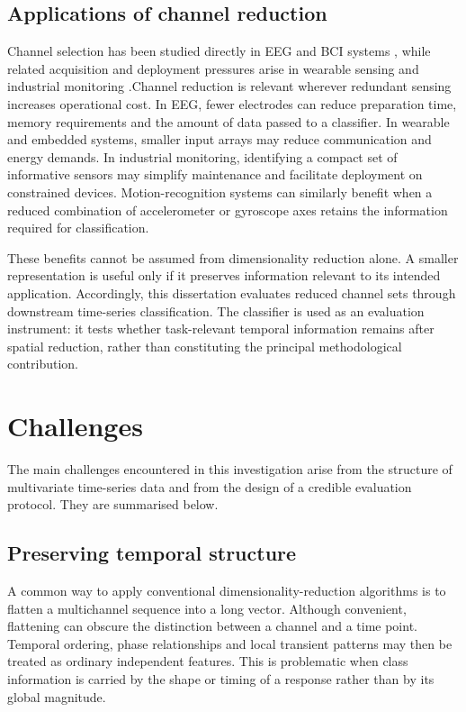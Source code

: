 \subsection{Applications of channel reduction}

Channel selection has been studied directly in EEG and BCI systems
\citep{alotaiby2015channels,lal2004channel,arvaneh2011sparsecsp},
while related acquisition and deployment pressures arise in wearable sensing
and industrial monitoring
\citep{lara2013wearable,bulling2014activity,
venkatasubramanian2003fault}.Channel reduction is relevant wherever redundant sensing increases operational cost. In EEG, fewer electrodes can reduce preparation time, memory requirements and the amount of data passed to a classifier. In wearable and embedded systems, smaller input arrays may reduce communication and energy demands. In industrial monitoring, identifying a compact set of informative sensors may simplify maintenance and facilitate deployment on constrained devices. Motion-recognition systems can similarly benefit when a reduced combination of accelerometer or gyroscope axes retains the information required for classification.

These benefits cannot be assumed from dimensionality reduction alone. A smaller representation is useful only if it preserves information relevant to its intended application. Accordingly, this dissertation evaluates reduced channel sets through downstream time-series classification. The classifier is used as an evaluation instrument: it tests whether task-relevant temporal information remains after spatial reduction, rather than constituting the principal methodological contribution.


\section{Challenges}

The main challenges encountered in this investigation arise from the structure of multivariate time-series data and from the design of a credible evaluation protocol. They are summarised below.

\subsection{Preserving temporal structure}

A common way to apply conventional dimensionality-reduction algorithms is to flatten a multichannel sequence into a long vector. Although convenient, flattening can obscure the distinction between a channel and a time point. Temporal ordering, phase relationships and local transient patterns may then be treated as ordinary independent features. This is problematic when class information is carried by the shape or timing of a response rather than by its global magnitude.

